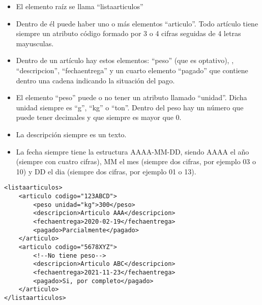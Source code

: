 \documentclass{examen}
\begin{document}

\begin{itemize}
\item{    El elemento raíz se llama ``listaarticulos''}
\item{    Dentro de él puede haber uno o más elementos ``articulo''. Todo artículo tiene siempre un atributo código formado por 3 o 4 cifras seguidas de 4 letras mayusculas.}
\item{  Dentro de un artículo hay estos elementos: ``peso'' (que es optativo), , ``descripcion'', ``fechaentrega'' y un cuarto elemento ``pagado'' que contiene dentro una cadena indicando la situación del pago.}
\item{   El elemento ``peso'' puede o no tener un atributo llamado ``unidad''. Dicha unidad siempre es ``g'', ``kg'' o ``ton''. Dentro del peso hay un número que puede tener decimales y que siempre es mayor que 0.}
\item{La descripción siempre es un texto.}
\item{La fecha siempre tiene la estructura AAAA-MM-DD, siendo AAAA el año (siempre con cuatro cifras), MM el mes (siempre dos cifras, por ejemplo 03 o 10) y DD el dia (siempre dos cifras, por ejemplo 01 o 13).}

\end{itemize}

\break




\begin{verbatim}
<listaarticulos>
    <articulo codigo="123ABCD">
        <peso unidad="kg">300</peso>
        <descripcion>Articulo AAA</descripcion>
        <fechaentrega>2020-02-19</fechaentrega>
        <pagado>Parcialmente</pagado>
    </articulo>
    <articulo codigo="5678XYZ">
        <!--No tiene peso-->
        <descripcion>Articulo ABC</descripcion>
        <fechaentrega>2021-11-23</fechaentrega>
        <pagado>Si, por completo</pagado>
    </articulo>
</listaarticulos>
\end{verbatim}
\end{document}
